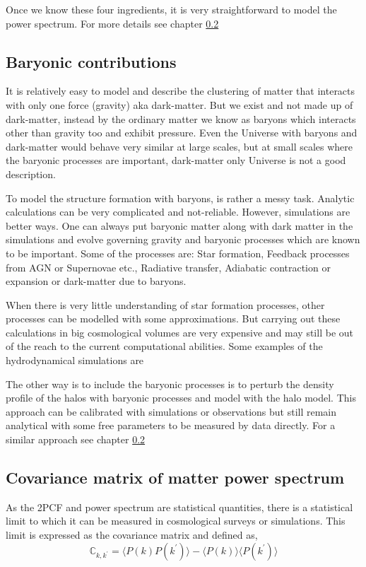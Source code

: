 Once we know these four ingredients, it is very straightforward to model the power spectrum. For 
more details see chapter \ref{}

\subsection{Baryonic contributions}
It is relatively easy to model and describe the clustering of matter that interacts with only 
one force (gravity) aka dark-matter. But we exist and not made up of dark-matter, instead by the
ordinary matter we know as baryons which interacts other than gravity too and exhibit pressure. 
Even the Universe with baryons and dark-matter would behave very similar at large scales,
but at small scales where the baryonic processes are important, dark-matter only Universe is
not a good description. 

To model the structure formation with baryons, is rather a messy task. Analytic calculations
can be very complicated and not-reliable. However, simulations are better ways. One can always
put baryonic matter along with dark matter in the simulations and evolve governing gravity and
baryonic processes which are known to be important. Some of the processes are: 
Star formation,
Feedback processes from AGN or Supernovae etc.,
Radiative transfer,
Adiabatic contraction or expansion or dark-matter due to baryons.

When there is very little understanding of star formation processes, other processes can be 
modelled with some approximations. But carrying out these calculations in big cosmological 
volumes are very expensive and may still be out of the reach to the current computational 
abilities. Some examples of the hydrodynamical simulations are \cite{}

The other way is to include the baryonic processes is to perturb the density profile 
of the halos with baryonic processes and model with the halo model. This approach can 
be calibrated with simulations or observations but still remain analytical with some 
free parameters to be measured by data directly. For a similar approach see chapter \ref{}



\subsection{Covariance matrix of matter power spectrum}
As the 2PCF and power spectrum are statistical quantities, there is a statistical limit
to which it can be measured in cosmological surveys or simulations. This limit is expressed
as the covariance matrix and defined as,
\begin{equation}
	\mathbb{C}_{k,k^{\prime}}	= 
			\langle P(k)P(k^{\prime}) \rangle - 
			\langle P(k)\rangle \langle P(k^{\prime})\rangle
\end{equation}


